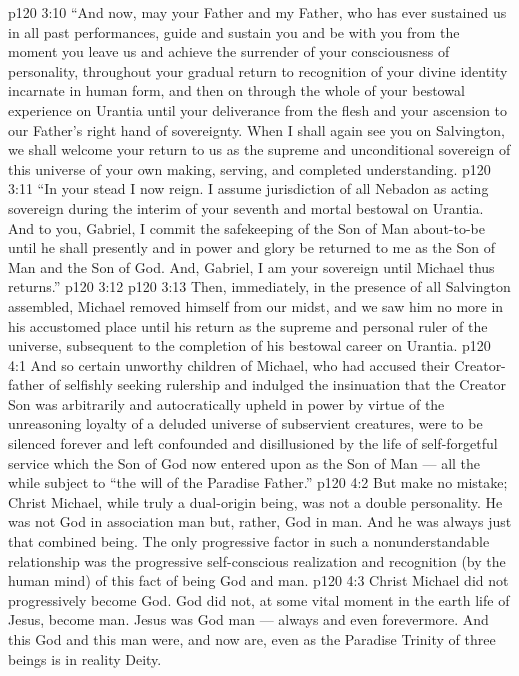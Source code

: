 \vs p120 3:10 “And now, may your Father and my Father, who has ever sustained us in all past performances, guide and sustain you and be with you from the moment you leave us and achieve the surrender of your consciousness of personality, throughout your gradual return to recognition of your divine identity incarnate in human form, and then on through the whole of your bestowal experience on Urantia until your deliverance from the flesh and your ascension to our Father’s right hand of sovereignty. When I shall again see you on Salvington, we shall welcome your return to us as the supreme and unconditional sovereign of this universe of your own making, serving, and completed understanding.
\vs p120 3:11 “In your stead I now reign. I assume jurisdiction of all Nebadon as acting sovereign during the interim of your seventh and mortal bestowal on Urantia. And to you, Gabriel, I commit the safekeeping of the Son of Man about\hyp{}to\hyp{}be until he shall presently and in power and glory be returned to me as the Son of Man and the Son of God. And, Gabriel, I am your sovereign until Michael thus returns.”
\vs p120 3:12 \separatorshort
\vs p120 3:13 Then, immediately, in the presence of all Salvington assembled, Michael removed himself from our midst, and we saw him no more in his accustomed place until his return as the supreme and personal ruler of the universe, subsequent to the completion of his bestowal career on Urantia.
\vs p120 4:1 And so certain unworthy children of Michael, who had accused their Creator\hyp{}father of selfishly seeking rulership and indulged the insinuation that the Creator Son was arbitrarily and autocratically upheld in power by virtue of the unreasoning loyalty of a deluded universe of subservient creatures, were to be silenced forever and left confounded and disillusioned by the life of self\hyp{}forgetful service which the Son of God now entered upon as the Son of Man --- all the while subject to “the will of the Paradise Father.”
\vs p120 4:2 \pc But make no mistake; Christ Michael, while truly a dual\hyp{}origin being, was not a double personality. He was not God in association  man but, rather, God  in man. And he was always just that combined being. The only progressive factor in such a nonunderstandable relationship was the progressive self\hyp{}conscious realization and recognition (by the human mind) of this fact of being God and man.
\vs p120 4:3 Christ Michael did not progressively become God. God did not, at some vital moment in the earth life of Jesus, become man. Jesus was God  man --- always and even forevermore. And this God and this man were, and now are,  even as the Paradise Trinity of three beings is in reality  Deity.

